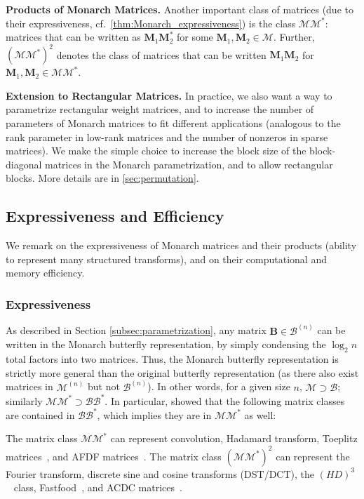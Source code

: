 \textbf{Products of Monarch Matrices.} Another important class of matrices (due to their expressiveness, cf.\ \ref{thm:Monarch_expressiveness})
is the class $\mathcal{M}\mathcal{M}^*$: matrices that can be written as $\mathbf{M}_1\mathbf{M}_2^*$ for some $\mathbf{M}_1, \mathbf{M}_2 \in \mathcal{M}$. Further, $(\mathcal{M}\mathcal{M}^*)^2$ denotes the class of matrices that can be written $\mathbf{M}_1\mathbf{M}_2$ for $\mathbf{M}_1, \mathbf{M}_2 \in \mathcal{M}\mathcal{M}^*$.

\textbf{Extension to Rectangular Matrices.} In practice, we also want a way to parametrize rectangular weight matrices, and to increase the number of parameters of Monarch matrices to fit different applications (analogous to the rank parameter in low-rank matrices and the number of nonzeros in sparse matrices). We make the simple choice to increase the block size of the block-diagonal matrices in the Monarch parametrization, and to allow rectangular blocks. More details are in \ref{sec:permutation}.

\subsection{Expressiveness and Efficiency}
\label{subsec:ee}
We remark on the expressiveness of Monarch matrices and their products (ability to represent many structured transforms), and on their computational and memory efficiency. 
\subsubsection{Expressiveness}
As described in Section \ref{subsec:parametrization}, any matrix $\mathbf{B} \in \mathcal{B}^{(n)}$ can be written in the Monarch butterfly representation, by simply condensing the $\log_2 n$ total factors into two matrices. Thus, the Monarch butterfly representation is strictly more general than the original butterfly representation (as there also exist matrices in $\mathcal{M}^{(n)}$ but not $\mathcal{B}^{(n)}$).
In other words, for a given size $n$, $\mathcal{M} \supset \mathcal{B}$; similarly $\mathcal{M}\mathcal{M}^* \supset \mathcal{B}\mathcal{B}^*$. 
In particular, \citet{dao2020kaleidoscope} showed that the following matrix classes are contained in $\mathcal{B}\mathcal{B}^*$,
which implies they are in $\mathcal{M}\mathcal{M}^*$ as well:

\begin{proposition}\label{thm:Monarch_expressiveness}
  The matrix class $\mathcal{M}\mathcal{M}^*$ can represent convolution, Hadamard transform, Toeplitz matrices~\citep{gray2006toeplitz}, and AFDF matrices~\citep{moczulski2015acdc}. The matrix class $(\mathcal{M}\mathcal{M}^*)^2$ can represent the Fourier transform, discrete sine and cosine transforms (DST/DCT), the $(HD)^3$~\citep{yu2016orthogonal} class, Fastfood~\citep{le2013fastfood}, and ACDC matrices~\citep{moczulski2015acdc}.
\end{proposition}


